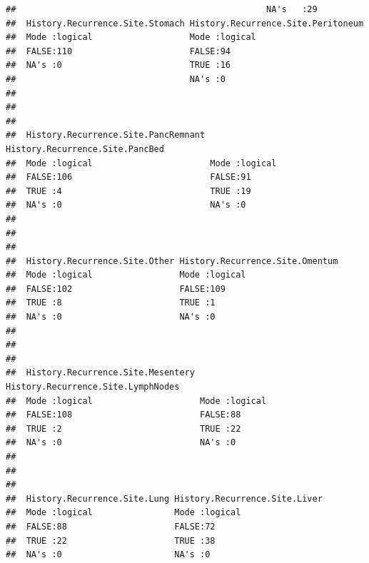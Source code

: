 \documentclass{article}
\begin{document}
\begin{knitrout}
\begin{kframe}
\begin{verbatim}
##                                                 NA's   :29             
##  History.Recurrence.Site.Stomach History.Recurrence.Site.Peritoneum
##  Mode :logical                   Mode :logical                     
##  FALSE:110                       FALSE:94                          
##  NA's :0                         TRUE :16                          
##                                  NA's :0                           
##                                                                    
##                                                                    
##                                                                    
##  History.Recurrence.Site.PancRemnant History.Recurrence.Site.PancBed
##  Mode :logical                       Mode :logical                  
##  FALSE:106                           FALSE:91                       
##  TRUE :4                             TRUE :19                       
##  NA's :0                             NA's :0                        
##                                                                     
##                                                                     
##                                                                     
##  History.Recurrence.Site.Other History.Recurrence.Site.Omentum
##  Mode :logical                 Mode :logical                  
##  FALSE:102                     FALSE:109                      
##  TRUE :8                       TRUE :1                        
##  NA's :0                       NA's :0                        
##                                                               
##                                                               
##                                                               
##  History.Recurrence.Site.Mesentery History.Recurrence.Site.LymphNodes
##  Mode :logical                     Mode :logical                     
##  FALSE:108                         FALSE:88                          
##  TRUE :2                           TRUE :22                          
##  NA's :0                           NA's :0                           
##                                                                      
##                                                                      
##                                                                      
##  History.Recurrence.Site.Lung History.Recurrence.Site.Liver
##  Mode :logical                Mode :logical                
##  FALSE:88                     FALSE:72                     
##  TRUE :22                     TRUE :38                     
##  NA's :0                      NA's :0                      

\end{verbatim}
\end{kframe}
\end{knitrout}
\end{document}
